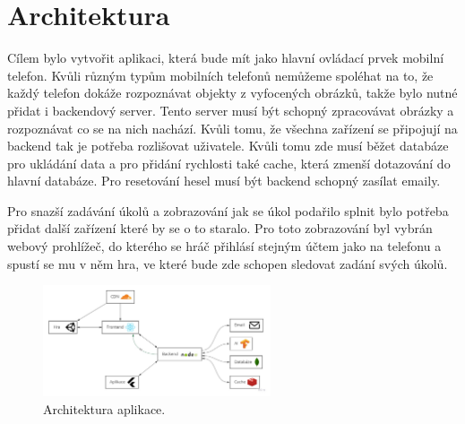 \section{Architektura}

Cílem bylo vytvořit aplikaci, která bude mít jako hlavní ovládací prvek mobilní telefon. Kvůli různým typům mobilních telefonů nemůžeme spoléhat na to, že každý telefon dokáže rozpoznávat objekty z vyfocených obrázků, takže bylo nutné přidat i backendový server. Tento server musí být schopný zpracovávat obrázky a rozpoznávat co se na nich nachází. Kvůli tomu, že všechna zařízení se připojují na backend tak je potřeba rozlišovat uživatele. Kvůli tomu zde musí běžet databáze pro ukládání data a pro přidání rychlosti také cache, která zmenší dotazování do hlavní databáze. Pro resetování hesel musí být backend schopný zasílat emaily. \par
Pro snazší zadávání úkolů a zobrazování jak se úkol podařilo splnit bylo potřeba přidat další zařízení které by se o to staralo. Pro toto zobrazování byl vybrán webový prohlížeč, do kterého se hráč přihlásí stejným účtem jako na telefonu a spustí se mu v něm hra, ve které bude zde schopen sledovat zadání svých úkolů.

\begin{figure}[h]
    \centering
    \includegraphics[width=0.6\textwidth]{img/architektura.jpg}
    \caption{Architektura aplikace.}
    \label{fig:architektura}
\end{figure}